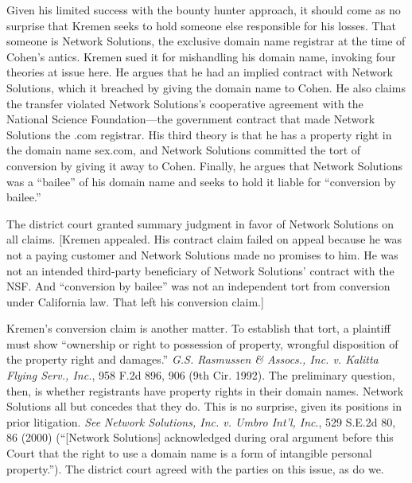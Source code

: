 Given his limited success with the bounty hunter approach, it should come as no
surprise that Kremen seeks to hold someone else responsible for his losses.
That someone is Network Solutions, the exclusive domain name registrar at the
time of Cohen's antics. Kremen sued it for mishandling his domain name,
invoking four theories at issue here. He argues that he had an implied contract
with Network Solutions, which it breached by giving the domain name to Cohen.
He also claims the transfer violated Network Solutions's cooperative agreement
with the National Science Foundation---the government contract that made
Network Solutions the .com registrar. His third theory is that he has a
property right in the domain name sex.com, and Network Solutions committed the
tort of conversion by giving it away to Cohen. Finally, he argues that Network
Solutions was a ``bailee'' of his domain name and seeks to hold it liable for
``conversion by bailee.''

The district court granted summary judgment in favor of Network Solutions on all
claims. [Kremen appealed. His contract claim failed on appeal because he was
not a paying customer and Network Solutions made no promises to him. He was not
an intended third-party beneficiary of Network Solutions' contract with the
NSF. And ``conversion by bailee'' was not an independent tort from conversion
under California law. That left his conversion claim.]


Kremen's conversion claim is another matter. To establish that tort, a plaintiff
must show ``ownership or right to possession of property, wrongful disposition
of the property right and damages.'' \textit{G.S. Rasmussen \& Assocs., Inc. v.
Kalitta Flying Serv., Inc.}, 958 F.2d 896, 906 (9th Cir. 1992). The preliminary
question, then, is whether registrants have property rights in their domain
names. Network Solutions all but concedes that they do. This is no surprise,
given its positions in prior litigation. \textit{See} \textit{Network
Solutions, Inc. v. Umbro Int'l, Inc}., 529 S.E.2d 80, 86 (2000) (``[Network
Solutions] acknowledged during oral argument before this Court that the right
to use a domain name is a form of intangible personal
property.''). The district court agreed with the
parties on this issue, as do we.

